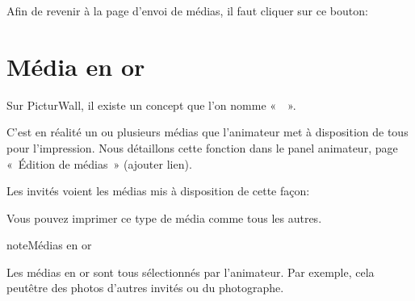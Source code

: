 \documentclass[letterpaper,10pt,french]{sphinxmanual}
\begin{document}
\sphinxAtStartPar
Afin de revenir à la page d’envoi de médias, il faut cliquer sur ce bouton: 


\section{Média en or}
\label{\detokenize{panel_invite/index:media-en-or}}
\sphinxAtStartPar
Sur PicturWall, il existe un concept que l’on nomme «  ».

\sphinxAtStartPar
C’est en réalité un ou plusieurs médias que l’animateur met à disposition de tous pour l’impression. Nous détaillons cette fonction dans le panel animateur, page « Édition de médias » (ajouter lien).

\sphinxAtStartPar
Les invités voient les médias mis à disposition de cette façon:

\begin{figure}[htbp]
\centering

\noindent{}
\end{figure}

\sphinxAtStartPar
Vous pouvez imprimer ce type de média comme tous les autres.

\begin{sphinxadmonition}{note}{Médias en or}

\sphinxAtStartPar
Les médias en or sont tous sélectionnés par l’animateur. Par exemple, cela peut\sphinxhyphen{}être des photos d’autres invités ou du photographe.
\end{sphinxadmonition}



\renewcommand{\indexname}{Index}
\printindex
\end{document}
